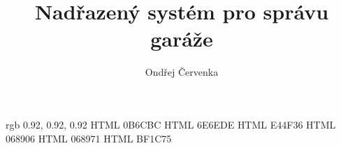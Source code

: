 \documentclass[thesis=M,czech]{templates/FITthesis}[2012/06/26]
\title{Nadřazený systém pro správu garáže}
\author{Ondřej Červenka} %
\begin{document}
\definecolor {codebg} {rgb} {0.92, 0.92, 0.92}
\definecolor {blue} {HTML} {0B6CBC}
\definecolor {blue2} {HTML} {6E6EDE}
\definecolor {red} {HTML} {E44F36}
\definecolor {green} {HTML} {068906}
\definecolor {cyan} {HTML} {068971}
\definecolor {magenta} {HTML} {BF1C75}


\begin{introduction}
	
\end{introduction}







\begin{conclusion}
	
\end{conclusion}




\appendix



\end{document}
